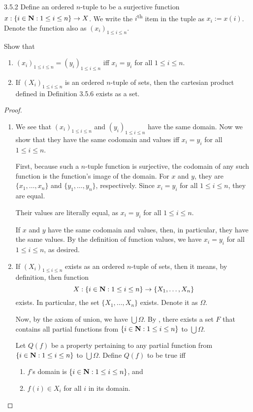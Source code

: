 \begin{exercise}{3.5.2}
	Define an ordered $n$-tuple to be a surjective function $x : \{i \in \mathbf{N} : 1 \le i \le n\} \to X$. We write the $i$\textsuperscript{th} item in the tuple as $x_i := x(i)$. Denote the function also as $(x_i)_{1 \le i \le n}$. 
	
	Show that 
	\begin{enumerate}
		\item $(x_i)_{1 \le i \le n} = (y_i)_{1 \le i \le n}$ iff $x_i = y_i$ for all $1 \le i \le n$.
		\item If $(X_i)_{1 \le i \le n}$ is an ordered $n$-tuple of sets, then the cartesian product defined in Definition 3.5.6 exists as a set.
	\end{enumerate}
\end{exercise}
\begin{proof}\leavevmode
	\begin{enumerate}
		\item We see that $(x_i)_{1 \le i \le n}$ and $(y_i)_{1 \le i \le n}$ have the same domain. Now we show that they have the same codomain and values iff $x_i = y_i$ for all $1 \le i \le n$.
		
		\myifbox
		First, because such a $n$-tuple function is surjective, the codomain of any such function is the function's image of the domain. For $x$ and $y$, they are $\{x_1, \dots, x_n\}$ and $\{y_1, \dots, y_n\}$, respectively. Since $x_i = y_i$ for all $1 \le i \le n$, they are equal.
		
		Their values are literally equal, as $x_i = y_i$ for all $1 \le i \le n$.
		
		\myoifbox
		If $x$ and $y$ have the same codomain and values, then, in particular, they have the same values. By the definition of function values, we have $x_i = y_i$ for all $1 \le i \le n$, as desired.
		
		\item If $(X_i)_{1 \le i \le n}$ exists as an ordered $n$-tuple of sets, then it means, by definition, then function
		\[
			X : \{i \in \mathbf{N} : 1 \le i \le n\} \to \{X_1, \dots, X_n\}
		\]
		exists. In particular, the set $\{X_1, \dots, X_n\}$ exists. Denote it as $\Omega$.
		
		Now, by the axiom of union, we have $\bigcup \Omega$. By , there exists a set $F$ that contains all partial functions from $\{i \in \mathbf{N} : 1 \le i \le n\}$ to $\bigcup \Omega$.
		
		Let $Q(f)$ be a property pertaining to any partial function from $\{i \in \mathbf{N} : 1 \le i \le n\}$ to $\bigcup \Omega$. Define $Q(f)$ to be true iff
		\begin{enumerate}
			\item $f$'s domain is $\{i \in \mathbf{N} : 1 \le i \le n\}$, and
			\item $f(i) \in X_i$ for all $i$ in its domain. \label{exer.3.5.2.q.of.f.2}
		\end{enumerate}
	

\end{enumerate}
\end{proof}
